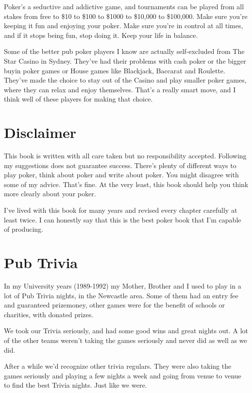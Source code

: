 Poker's a seductive and addictive game,
and tournaments can be played from all stakes from free to \$10 to \$100
to \$1000 to \$10,000 to \$100,000. Make sure you're keeping it fun
and enjoying your poker. Make sure you're in control at all times,
and if it stops being fun, stop doing it. Keep your life in balance.

Some of the better pub poker players I know are actually
self-excluded from The Star Casino in Sydney. They've had
their problems with cash poker or the bigger buyin poker games or
House games like Blackjack, Baccarat and Roulette. They've
made the choice to stay out of the Casino and play smaller poker games,
where they can relax and enjoy themselves. That's a really smart
move, and I think well of these players for making that choice.

\section*{Disclaimer}

This book is written with all care taken but no responsibility accepted.
Following my suggestions does not guarantee success.
There's plenty of different ways to play poker, think about poker
and write about poker. You might disagree with some of my advice.
That's fine. At the very least, this book should help you think
more clearly about your poker.

I've lived with this book for many years and revised every chapter
carefully at least twice. I can honestly say that this is the best
poker book that I'm capable of producing.

\section*{Pub Trivia}

In my University years (1989-1992) my Mother, Brother and I used to
play in a lot of Pub Trivia nights, in the Newcastle area. Some of
them had an entry fee and guaranteed prizemoney, other games were for
the benefit of schools or charities, with donated prizes.

We took our Trivia seriously, and had some good wins and
great nights out. A lot of the other teams weren't taking the games
seriously and never did as well as we did.

After a while we'd recognize other trivia regulars. They were also
taking the games seriously and playing a few nights a week and going
from venue to venue to find the best Trivia nights. Just like we
were.

